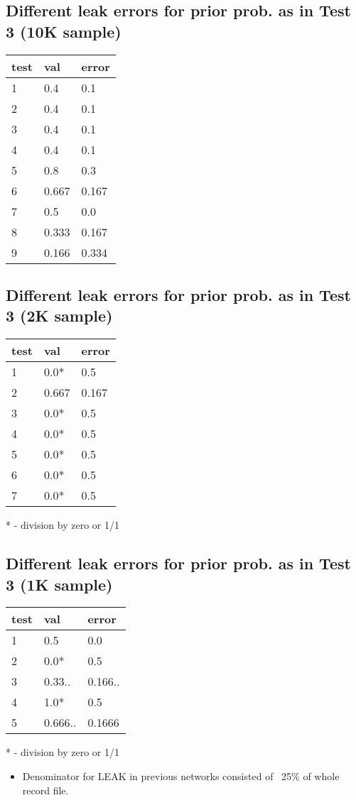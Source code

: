 \documentclass{article}
\begin{document}
\subsection{Different leak errors for prior prob. as in Test 3 (10K sample)}
\begin{longtable}{|l|l||p{2cm}|}
	\hline
	test & val &error \\\hline\hline
	1 & 0.4 & 0.1 \\\hline
	2 & 0.4 & 0.1 \\\hline
	3 & 0.4 & 0.1 \\\hline
	4 & 0.4 & 0.1 \\\hline
	5 & 0.8 & 0.3 \\\hline
	6 & 0.667 & 0.167 \\\hline
	7 & 0.5 & 0.0 \\\hline
	8 & 0.333 & 0.167 \\\hline
	9 & 0.166 & 0.334 \\\hline
\end{longtable}

\subsection{Different leak errors for prior prob. as in Test 3 (2K sample)}
\begin{longtable}{|l|l||p{2cm}|}
	\hline
	test & val & error \\\hline\hline
	1 & 0.0* & 0.5 \\\hline
	2 & 0.667 & 0.167 \\\hline
	3 & 0.0* & 0.5 \\\hline
	4 & 0.0* & 0.5 \\\hline
	5 & 0.0* & 0.5\\\hline
	6 & 0.0* & 0.5\\\hline
	7 & 0.0* & 0.5 \\\hline
\end{longtable}
* - division by zero or 1/1

\subsection{Different leak errors for prior prob. as in Test 3 (1K sample)}
\begin{longtable}{|l|l||p{2cm}|}
	\hline
	test & val & error \\\hline\hline
	1 & 0.5 & 0.0 \\\hline
	2 & 0.0* & 0.5 \\\hline
	3 & 0.33.. & 0.166.. \\\hline
	4 & 1.0* & 0.5\\\hline
	5 & 0.666.. & 0.1666\\\hline
\end{longtable}
* - division by zero or 1/1

\begin{itemize}
	\item Denominator for LEAK in previous networks consisted of ~25\% of whole record file.
\end{itemize}


\end{document}
